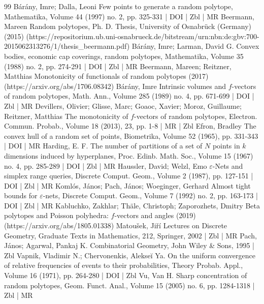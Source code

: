 \begin{thebibliography}{99}
Bárány, Imre; Dalla, Leoni Few points to generate a random polytope, Mathematika, Volume 44 (1997) no. 2, pp. 325-331 | DOI | Zbl | MR
Beermann, Mareen Random polytopes, Ph. D. Thesis, University of Osnabrück (Germany) (2015) (https://repositorium.ub.uni-osnabrueck.de/bitstream/urn:nbn:de:gbv:700-2015062313276/1/thesis\_beermann.pdf)
Bárány, Imre; Larman, David G. Convex bodies, economic cap coverings, random polytopes, Mathematika, Volume 35 (1988) no. 2, pp. 274-291 | DOI | Zbl | MR
Beermann, Mareen; Reitzner, Matthias Monotonicity of functionals of random polytopes (2017) (https://arxiv.org/abs/1706.08342)
Bárány, Imre Intrinsic volumes and $f$-vectors of random polytopes, Math. Ann., Volume 285 (1989) no. 4, pp. 671-699 | DOI | Zbl | MR
Devillers, Olivier; Glisse, Marc; Goaoc, Xavier; Moroz, Guillaume; Reitzner, Matthias The monotonicity of $f$-vectors of random polytopes, Electron. Commun. Probab., Volume 18 (2013), 23, pp. 1-8 | MR | Zbl
Efron, Bradley The convex hull of a random set of points, Biometrika, Volume 52 (1965), pp. 331-343 | DOI | MR
Harding, E. F. The number of partitions of a set of ${N}$ points in $k$ dimensions induced by hyperplanes, Proc. Edinb. Math. Soc., Volume 15 (1967) no. 4, pp. 285-289 | DOI | Zbl | MR
Haussler, David; Welzl, Emo $\varepsilon $-Nets and simplex range queries, Discrete Comput. Geom., Volume 2 (1987), pp. 127-151 | DOI | Zbl | MR
Komlós, János; Pach, János; Woeginger, Gerhard Almost tight bounds for $\varepsilon $-nets, Discrete Comput. Geom., Volume 7 (1992) no. 2, pp. 163-173 | DOI | Zbl | MR
Kabluchko, Zakhlar; Thäle, Christoph; Zaporozhets, Dmitry Beta polytopes and Poisson polyhedra: $f$-vectors and angles (2019) (https://arxiv.org/abs/1805.01338)
Matoušek, Jiří Lectures on Discrete Geometry, Graduate Texts in Mathematics, 212, Springer, 2002 | Zbl | MR
Pach, János; Agarwal, Pankaj K. Combinatorial Geometry, John Wiley \& Sons, 1995 | Zbl
Vapnik, Vladimir N.; Chervonenkis, Alekseĭ Ya. On the uniform convergence of relative frequencies of events to their probabilities, Theory Probab. Appl., Volume 16 (1971), pp. 264-280 | DOI | Zbl
Vu, Van H. Sharp concentration of random polytopes, Geom. Funct. Anal., Volume 15 (2005) no. 6, pp. 1284-1318 | Zbl | MR
\end{thebibliography}
